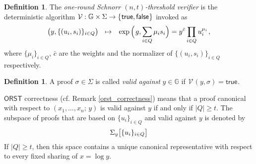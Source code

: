 \documentclass[10pt, psamsfonts, reqno]{amsart}
\theoremstyle{definition}
\newtheorem{defn}[thm]{Definition}
\theoremstyle{remark}
\numberwithin{equation}{section}
\begin{document}
\begin{defn}\label{orst_verifier}
The \textit{one-round Schnorr $(n, t)$-threshold verifier}
is the deterministic algorithm
$\mathcal{V}: \mathbb{G} \times \Sigma \rightarrow
\{\hspace{0.5pt}\textsf{true}, \textsf{false}\hspace{0.5pt}\}$
invoked as
\vspace{5pt}
\begin{equation*}
\big(y, \{(u_i, s_i)\}_{i \in Q}\big)\
\ \mapsto
\ \hspace{4pt}\exp\Big(\hspace{1pt}g, {\sum_{i \in Q} \mu_i s_i}\Big) =
y ^ {\bar{c}} \prod_{i \in Q} u_i^{\mu_i}
\hspace{1pt},
\vspace{5pt}
\end{equation*}
where $\{\mu_i\}_{i \in Q}$, $\bar{c}$ are
the weights and the normalizer of $\{(u_i, s_i)\}_{i \in Q}$
respectively.
\end{defn}

\begin{defn}\label{orst_validity_definition}
A proof $\sigma \in \Sigma$ is called
\textit{valid against} $y \in \mathbb{G}$ if
$\hspace{1pt}\mathcal{V}\hspace{1pt}(y, \sigma)
= \textsf{true}\hspace{1pt}$.
\end{defn}

\noindent
$\mathsf{ORST}$ correctness
(cf. Remark \ref{orst_correctness})
means that a proof canonical with respect
to $(x_1, \dots, x_n;\hspace{2pt} y)$
is valid against $y$ if and only if $|Q| \ge t$.
The subspace of proofs that are based on
$\{u_i\}_{i \in Q}$ and valid against $y$ is denoted by
\vspace{5pt}
\begin{equation*}\label{orst_valid_proofs_on_commitments_def}
\Sigma_y \big[\{u_i\}_{i \in Q}\big]
\vspace{5pt}
\end{equation*}
If $|Q| \ge t$, then this space
contains a unique canonical representative
with respect to every fixed sharing of $x = \log y$.
\end{document}
